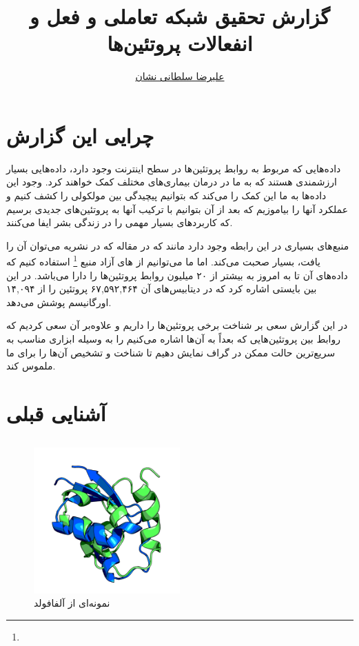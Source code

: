 \documentclass[10pt, a4paper]{article}
\title{گزارش تحقیق شبکه تعاملی و فعل و انفعالات پروتئین‌ها}
\author{\href{mailto:a.soltani@iau-tnb.ac.ir}{علیرضا سلطانی نشان}}
\begin{document}
\maketitle

\section{چرایی این گزارش}

داده‌هایی که مربوط به روابط پروتئین‌ها در سطح اینترنت وجود دارد، داده‌هایی بسیار
ارزشمندی هستند که به ما در درمان بیماری‌های مختلف کمک خواهند کرد. وجود این
داده‌ها به ما این کمک را می‌کند که بتوانیم پیچیدگی بین مولکولی را کشف کنیم و
عملکرد آنها را بیاموزیم که بعد از آن بتوانیم با ترکیب آنها به پروتئین‌های جدیدی
برسیم که کاربرد‌های بسیار مهمی را در زندگی بشر ایفا می‌کنند.

منبع‌های بسیاری در این رابطه وجود دارد مانند  که در مقاله  که در نشریه  می‌توان آن را یافت،
بسیار صحبت می‌کند. اما ما می‌توانیم از های آزاد منبع 
\footnote{  } استفاده کنیم که داده‌های آن تا به امروز به بیشتر
از ۲۰ میلیون روابط پروتئین‌ها را دارا می‌باشد. در این بین بایستی اشاره کرد که در
دیتابیس‌های آن ۶۷,۵۹۲,۴۶۴ پروتئین را از ۱۴,۰۹۴ اورگانیسم پوشش می‌دهد.

در این گزارش سعی بر شناخت برخی پروتئین‌ها را داریم و علاوه‌بر آن سعی کردیم که
روابط بین پروتئین‌هایی که بعداً به آن‌ها اشاره‌ می‌کنیم را به وسیله ابزاری مناسب
به سریع‌ترین حالت ممکن در گراف نمایش دهیم تا شناخت و تشخیص آن‌ها را برای ما
ملموس کند.

\section{آشنایی قبلی}

\subsection{}

\begin{figure}[H]
    \centering
    \includegraphics[width=0.5\textwidth]{images/sample_alphafold.png}
    \caption{نمونه‌ای از آلفافولد}
    \label{fig: alphafold}
\end{figure}
\end{document}
